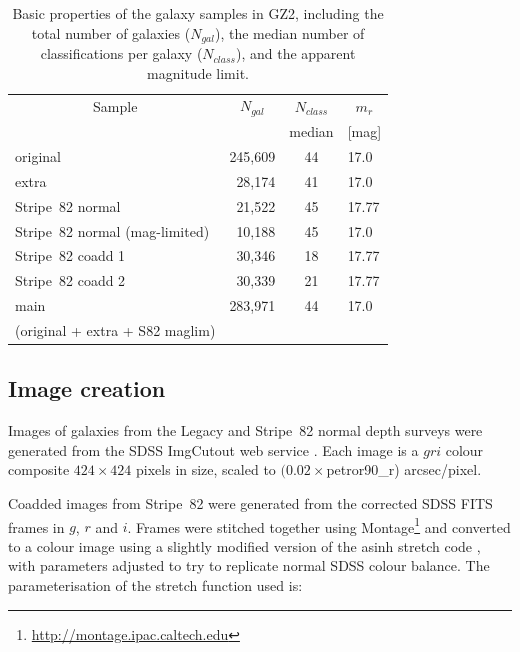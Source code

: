 \documentclass[useAMS,usenatbib]{mn2e}
\begin{document}
\begin{table}
 \begin{tabular}{@{}lrcl}
 \hline
\multicolumn{1}{c}{Sample} &
\multicolumn{1}{c}{$N_{gal}$} &
\multicolumn{1}{c}{$N_{class}$} &
\multicolumn{1}{c}{$m_r$} 
\\ 
\multicolumn{1}{c}{} &
\multicolumn{1}{c}{} &
\multicolumn{1}{c}{median} &
\multicolumn{1}{c}{[mag]} 
\\ 
\hline
\hline						%
original                       & 245,609 & 44  & 17.0   \\     %
extra                          &  28,174 & 41  & 17.0   \\     %
Stripe~82 normal               &  21,522 & 45  & 17.77  \\     %
Stripe~82 normal (mag-limited) &  10,188 & 45  & 17.0   \\     %
Stripe~82 coadd 1              &  30,346 & 18  & 17.77  \\     %
Stripe~82 coadd 2              &  30,339 & 21  & 17.77  \\     %
\hline
main                           & 283,971 & 44  & 17.0   \\     %
(original + extra + S82 maglim)& \\
\hline
 \end{tabular}
 \caption{Basic properties of the galaxy samples in GZ2, including the total number of galaxies ($N_{gal}$), the median number of classifications per galaxy ($N_{class}$), and the apparent magnitude limit. \label{tbl-sample}}
\end{table}

\subsection{Image creation}\label{ssec-imagecreation}

Images of galaxies from the Legacy and Stripe~82 normal depth surveys were generated from the SDSS ImgCutout web service \citep{nie04}. Each image is a $gri$ colour composite $424\times424$ pixels in size, scaled to $(0.02\times$petror90\_r) arcsec/pixel.

Coadded images from Stripe~82 were generated from the corrected SDSS FITS frames in $g$, $r$ and $i$. Frames were stitched together using Montage\footnote{\url{http://montage.ipac.caltech.edu}} and converted to a colour image using a slightly modified version of the asinh stretch code \citep{lup04}, with parameters adjusted to try to replicate normal SDSS colour balance. The parameterisation of the stretch function used is:
\end{document}
